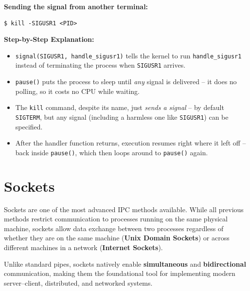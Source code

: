 \textbf{Sending the signal from another terminal:}
\begin{lstlisting}[language=Terminal]
$ kill -SIGUSR1 <PID>
\end{lstlisting}
\textbf{Step-by-Step Explanation:}
\begin{itemize}
    \item \texttt{signal(SIGUSR1, handle\_sigusr1)} tells the kernel to run \texttt{handle\_sigusr1} instead of terminating the process when \texttt{SIGUSR1} arrives.
    \item \texttt{pause()} puts the process to sleep until \emph{any} signal is delivered -- it does no polling, so it costs no CPU while waiting.
    \item The \texttt{kill} command, despite its name, just \emph{sends a signal} -- by default \texttt{SIGTERM}, but any signal (including a harmless one like \texttt{SIGUSR1}) can be specified.
    \item After the handler function returns, execution resumes right where it left off -- back inside \texttt{pause()}, which then loops around to \texttt{pause()} again.
\end{itemize}

\section{Sockets}
Sockets are one of the most advanced IPC methods available. While all previous methods restrict communication to processes running on the same physical machine, sockets allow data exchange between two processes regardless of whether they are on the same machine (\textbf{Unix Domain Sockets}) or across different machines in a network (\textbf{Internet Sockets}).

Unlike standard pipes, sockets natively enable \textbf{simultaneous} and \textbf{bidirectional} communication, making them the foundational tool for implementing modern server--client, distributed, and networked systems.

